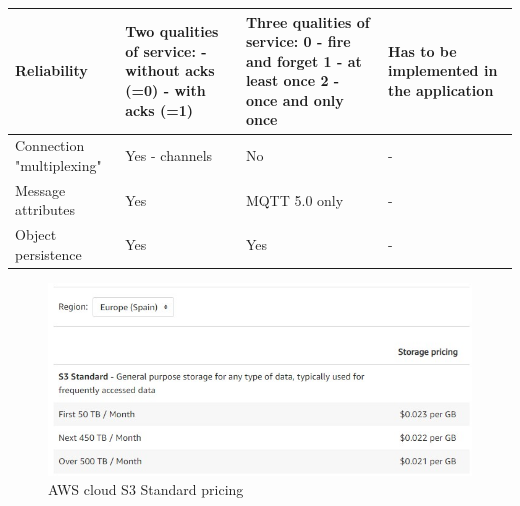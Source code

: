 \begin{table}[htbp]
\begin{center}
\begin{tabular}{|p{3cm}|p{4.5cm}|p{4.5cm}|p{4.5cm}|}
    \hline
    Reliability & Two qualities of service: -without acks (=0) - with acks (=1) & Three qualities of service: 0 - fire and forget 1 - at least once 2 - once and only once & Has to be implemented in the application\\
    \hline
    Connection "multiplexing" & Yes - channels & No & -\\
    \hline
    Message attributes & Yes & MQTT 5.0 only & -\\
    \hline
    Object persistence & Yes & Yes & -\\
    \hline
    \end{tabular}
    \label{edge-cloud protocols}
    \end{center}
    \end{table}
    
    
\begin{figure}[!ht]
    \centering
    \includegraphics[width=15cm]{functional_performance_specification/images/AWSpricing.jpg}
    \caption{AWS cloud S3 Standard pricing}
    \label{fig:AWS pricing}
\end{figure}